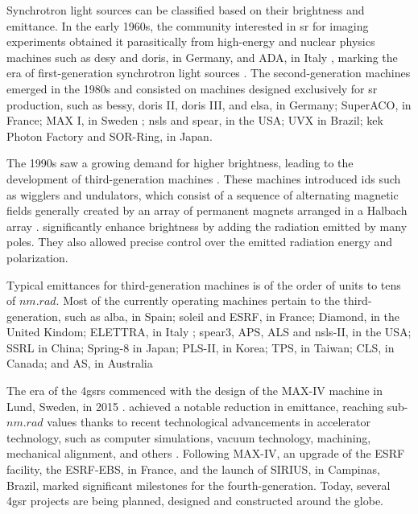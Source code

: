 Synchrotron light sources can be classified based on their brightness and emittance. In the early 1960s, the community interested in \gls*{sr} for imaging experiments obtained it parasitically from high-energy and nuclear physics machines such as \acrshort*{desy} and \acrshort*{doris}, in Germany, and ADA, in Italy \cite{simoulin_synchrotron_2016}, marking the era of first-generation synchrotron light sources \cite{liu_towards_2017}. The second-generation machines emerged in the 1980s and consisted on machines designed exclusively for \gls*{sr} production, such as \acrshort*{bessy}, \acrshort*{doris} II, \acrshort*{doris} III, and \acrshort*{elsa}, in Germany; \gls*{SuperACO}, in France; MAX I, in Sweden \cite{simoulin_synchrotron_2016}; \acrshort*{nsls} and \acrshort*{spear}, in the USA; \gls*{UVX} in Brazil; \gls*{kek} Photon Factory and \gls*{SOR-Ring}, in Japan.

The 1990s saw a growing demand for higher brightness, leading to the development of third-generation machines \cite{liu_towards_2017}. These machines introduced \glspl*{id} such as wigglers and undulators, which consist of a sequence of alternating magnetic fields generally created by an array of permanent magnets arranged in a Halbach array \cite{oi}.  significantly enhance brightness by adding the radiation emitted by many poles. They also allowed precise control over the emitted radiation energy and polarization.

Typical emittances for third-generation machines is of the order of units to tens of $\unit{nm}.\unit{rad}$. Most of the currently operating machines pertain to the third-generation, such as \gls*{alba}, in Spain; \acrshort*{soleil} and \acrshort*{ESRF}, in France; Diamond, in the United Kindom; \gls*{ELETTRA}, in Italy \cite{simoulin_synchrotron_2016}; \acrshort*{spear}3, \acrshort*{APS}, \acrshort*{ALS} and \acrshort*{nsls}-II, in the USA; SSRL in China; Spring-8 in Japan; PLS-II, in Korea; TPS, in Taiwan; CLS, in Canada; and AS, in Australia

The era of the \glspl*{4gsr} commenced with the design of the MAX-IV machine in Lund, Sweden, in 2015 \cite{liu_towards_2017,hettel_challenges_2014}.  achieved a notable reduction in emittance, reaching sub-$\unit{nm}.\unit{rad}$ values thanks to recent technological advancements in accelerator technology, such as computer simulations, vacuum technology, machining, mechanical alignment, and others  \cite{hettel_challenges_2014,liu_towards_2017}. Following MAX-IV, an upgrade of the \acrshort*{ESRF} facility, the ESRF-EBS, in France, and the launch of SIRIUS, in Campinas, Brazil, marked significant milestones for the fourth-generation. Today, several \gls*{4gsr} projects are being planned, designed and constructed around the globe.

